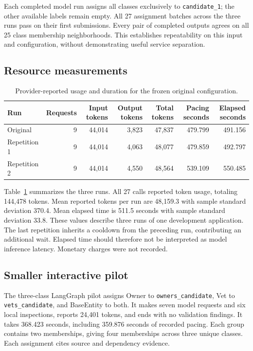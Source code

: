 Each completed model run assigns all classes exclusively to \texttt{candidate\_1}; the other available labels remain empty. All 27 assignment batches across the three runs pass on their first submissions. Every pair of completed outputs agrees on all 25 class membership neighborhoods. This establishes repeatability on this input and configuration, without demonstrating useful service separation.

\subsection{Resource measurements}

\begin{table}[t]
\centering
\caption{Provider-reported usage and duration for the frozen original configuration.}
\label{tab:resources}
\begin{tabular}{@{}lrrrrrr@{}}
\hline
Run & Requests & Input tokens & Output tokens & Total tokens & Pacing seconds & Elapsed seconds \\
\hline
Original & 9 & 44,014 & 3,823 & 47,837 & 479.799 & 491.156 \\
Repetition 1 & 9 & 44,014 & 4,063 & 48,077 & 479.859 & 492.797 \\
Repetition 2 & 9 & 44,014 & 4,550 & 48,564 & 539.109 & 550.485 \\
\hline
\end{tabular}
\end{table}


Table~\ref{tab:resources} summarizes the three runs. All 27 calls reported token usage, totaling 144,478 tokens. Mean reported tokens per run are 48,159.3 with sample standard deviation 370.4. Mean elapsed time is 511.5 seconds with sample standard deviation 33.8. These values describe three runs of one development application. The last repetition inherits a cooldown from the preceding run, contributing an additional wait. Elapsed time should therefore not be interpreted as model inference latency. Monetary charges were not recorded.

\subsection{Smaller interactive pilot}

The three-class LangGraph pilot assigns Owner to \texttt{owners\_candidate}, Vet to \texttt{vets\_candidate}, and BaseEntity to both. It makes seven model requests and six local inspections, reports 24,401 tokens, and ends with no validation findings. It takes 368.423 seconds, including 359.876 seconds of recorded pacing. Each group contains two memberships, giving four memberships across three unique classes. Each assignment cites source and dependency evidence.


